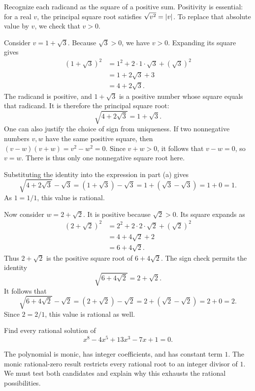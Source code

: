 \idea Recognize each radicand as the square of a positive sum. Positivity
is essential: for a real $v$, the principal square root satisfies
$\sqrt{v^2}=\left|v\right|$. To replace that absolute value by $v$, we check
that $v>0$.

Consider $v=1+\sqrt3$. Because $\sqrt3>0$, we have $v>0$. Expanding
its square gives
\begin{align*}
 (1+\sqrt3)^2
  &=1^2+2\cdot1\cdot\sqrt3+(\sqrt3)^2\\
  &=1+2\sqrt3+3\\
  &=4+2\sqrt3.
\end{align*}
The radicand is positive, and $1+\sqrt3$ is a positive number whose
square equals that radicand. It is therefore the principal square root:
\[
 \sqrt{4+2\sqrt3}=1+\sqrt3.
\]
One can also justify the choice of sign from uniqueness. If two
nonnegative numbers $v,w$ have the same positive square, then
$(v-w)(v+w)=v^2-w^2=0$. Since $v+w>0$, it follows that $v-w=0$,
so $v=w$. There is thus only one nonnegative square root here.

Substituting the identity into the expression in part (a) gives
\[
 \sqrt{4+2\sqrt3}-\sqrt3
 =(1+\sqrt3)-\sqrt3
 =1+(\sqrt3-\sqrt3)
 =1+0=1.
\]
As $1=1/1$, this value is rational.

Now consider $w=2+\sqrt2$. It is positive because $\sqrt2>0$.
Its square expands as
\begin{align*}
 (2+\sqrt2)^2
  &=2^2+2\cdot2\cdot\sqrt2+(\sqrt2)^2\\
  &=4+4\sqrt2+2\\
  &=6+4\sqrt2.
\end{align*}
Thus $2+\sqrt2$ is the positive square root of $6+4\sqrt2$.
The sign check permits the identity
\[
 \sqrt{6+4\sqrt2}=2+\sqrt2.
\]
It follows that
\[
 \sqrt{6+4\sqrt2}-\sqrt2
 =(2+\sqrt2)-\sqrt2
 =2+(\sqrt2-\sqrt2)
 =2+0=2.
\]
Since $2=2/1$, this value is rational as well.


\goal Find every rational solution of
\[
 x^8-4x^5+13x^3-7x+1=0.
\]

\idea The polynomial is monic, has integer coefficients, and has constant
term $1$. The monic rational-zero result restricts every rational root
to an integer divisor of $1$. We must test both candidates and explain
why this exhausts the rational possibilities.

